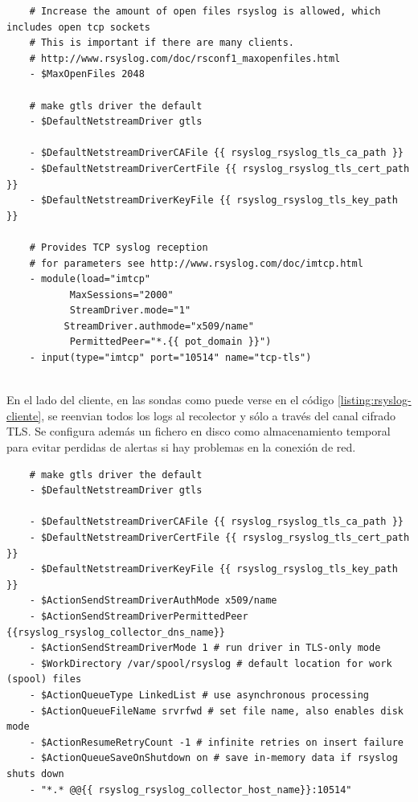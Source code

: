 \begin{verbatim}
    # Increase the amount of open files rsyslog is allowed, which includes open tcp sockets
    # This is important if there are many clients.
    # http://www.rsyslog.com/doc/rsconf1_maxopenfiles.html
    - $MaxOpenFiles 2048

    # make gtls driver the default
    - $DefaultNetstreamDriver gtls

    - $DefaultNetstreamDriverCAFile {{ rsyslog_rsyslog_tls_ca_path }}
    - $DefaultNetstreamDriverCertFile {{ rsyslog_rsyslog_tls_cert_path }}
    - $DefaultNetstreamDriverKeyFile {{ rsyslog_rsyslog_tls_key_path }}

    # Provides TCP syslog reception
    # for parameters see http://www.rsyslog.com/doc/imtcp.html
    - module(load="imtcp"
           MaxSessions="2000"
           StreamDriver.mode="1"
          StreamDriver.authmode="x509/name"
           PermittedPeer="*.{{ pot_domain }}")
    - input(type="imtcp" port="10514" name="tcp-tls")
         
\end{verbatim}
\bigskip

En el lado del cliente, en las sondas como puede verse en el código \ref{listing:rsyslog-cliente}, se reenvian todos los logs
al recolector y sólo a través del canal cifrado TLS. Se configura además un fichero en disco como almacenamiento temporal
para evitar perdidas de alertas si hay problemas en la conexión de red.

\begin{verbatim}
    # make gtls driver the default
    - $DefaultNetstreamDriver gtls
    
    - $DefaultNetstreamDriverCAFile {{ rsyslog_rsyslog_tls_ca_path }}
    - $DefaultNetstreamDriverCertFile {{ rsyslog_rsyslog_tls_cert_path }}
    - $DefaultNetstreamDriverKeyFile {{ rsyslog_rsyslog_tls_key_path }}
    - $ActionSendStreamDriverAuthMode x509/name
    - $ActionSendStreamDriverPermittedPeer {{rsyslog_rsyslog_collector_dns_name}}
    - $ActionSendStreamDriverMode 1 # run driver in TLS-only mode
    - $WorkDirectory /var/spool/rsyslog # default location for work (spool) files
    - $ActionQueueType LinkedList # use asynchronous processing
    - $ActionQueueFileName srvrfwd # set file name, also enables disk mode
    - $ActionResumeRetryCount -1 # infinite retries on insert failure
    - $ActionQueueSaveOnShutdown on # save in-memory data if rsyslog shuts down
    - "*.* @@{{ rsyslog_rsyslog_collector_host_name}}:10514"         
\end{verbatim}
\bigskip

